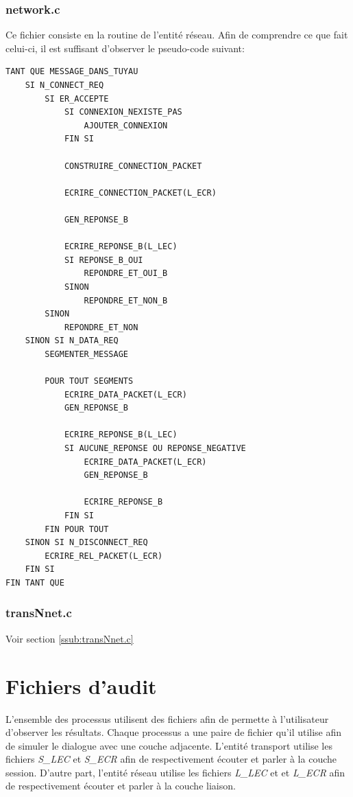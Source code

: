 \documentclass[11pt,french]{article}
\begin{document}
            \subsubsection{network.c} %
            \label{ssub:network.c}
                Ce fichier consiste en la routine de l'entité réseau. Afin de comprendre ce que fait celui-ci, il est suffisant d'observer le pseudo-code suivant:
\begin{lstlisting}
TANT QUE MESSAGE_DANS_TUYAU
    SI N_CONNECT_REQ
        SI ER_ACCEPTE
            SI CONNEXION_NEXISTE_PAS
                AJOUTER_CONNEXION
            FIN SI

            CONSTRUIRE_CONNECTION_PACKET

            ECRIRE_CONNECTION_PACKET(L_ECR)

            GEN_REPONSE_B

            ECRIRE_REPONSE_B(L_LEC)
            SI REPONSE_B_OUI
                REPONDRE_ET_OUI_B
            SINON
                REPONDRE_ET_NON_B
        SINON
            REPONDRE_ET_NON
    SINON SI N_DATA_REQ
        SEGMENTER_MESSAGE
        
        POUR TOUT SEGMENTS
            ECRIRE_DATA_PACKET(L_ECR)
            GEN_REPONSE_B
            
            ECRIRE_REPONSE_B(L_LEC)
            SI AUCUNE_REPONSE OU REPONSE_NEGATIVE
                ECRIRE_DATA_PACKET(L_ECR)
                GEN_REPONSE_B
                
                ECRIRE_REPONSE_B
            FIN SI
        FIN POUR TOUT
    SINON SI N_DISCONNECT_REQ
        ECRIRE_REL_PACKET(L_ECR)
    FIN SI
FIN TANT QUE
\end{lstlisting}
            \subsubsection{transNnet.c} %
            \label{ssub:transNnet.c-net}
                Voir section {\color{blue} \ref{ssub:transNnet.c}}
    \section{Fichiers d'audit} %
    \label{sec:fich-audit}
        L'ensemble des processus utilisent des fichiers afin de permette à l'utilisateur d'observer les résultats. Chaque processus a une paire
        de fichier qu'il utilise afin de simuler le dialogue avec une couche adjacente. L'entité transport utilise les fichiers \emph{S\_LEC}
        et \emph{S\_ECR} afin de respectivement écouter et parler à la couche session. D'autre part, l'entité réseau utilise les fichiers
        \emph{L\_LEC} et et \emph{L\_ECR} afin de respectivement écouter et parler à la couche liaison.
\end{document}
